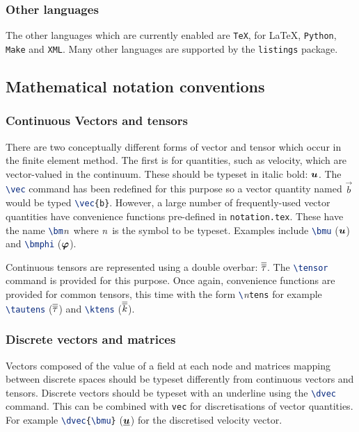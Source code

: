 \subsubsection{Other languages}

The other languages which are currently enabled are
\lstinline[language=TeX]+TeX+, for \LaTeX, \lstinline[language=TeX]+Python+,
\lstinline[language=TeX]+Make+ and \lstinline[language=TeX]+XML+. Many other
languages are supported by the \lstinline[language=TeX]+listings+ package.

\subsection{Mathematical notation conventions}

\subsubsection{Continuous Vectors and tensors}

There are two conceptually different forms of vector and tensor which occur
in the finite element method. The first is for quantities, such as velocity,
which are vector-valued in the continuum. These should be typeset in italic
bold: ${\mbox{\boldmath$u$}}$. The \lstinline[language=TeX]+\vec+ command has been redefined
for this purpose so a vector quantity named $\vec{b}$ would be typed
\lstinline[language=TeX]+\vec{b}+. However, a large number of
frequently-used vector quantities have convenience functions pre-defined in
\lstinline[language=bash]+notation.tex+. These have the name
\lstinline[language=TeX]+\bm+\textit{n}\ where \textit{n}\ is the symbol to
be typeset. Examples include \lstinline[language=TeX]+\bmu+ (${\mbox{\boldmath$u$}}$) and
\lstinline[language=TeX]+\bmphi+ (${\mbox{\boldmath$\varphi$}}$).

Continuous tensors are represented using a double overbar:
$\overline{\overline{\tau}}$. The \lstinline[language=TeX]+\tensor+ command is provided
for this purpose. Once again, convenience functions are provided for common
tensors, this time with the form
\lstinline[language=TeX]+\+\textit{n}\lstinline[language=TeX]+tens+ for
example \lstinline[language=TeX]+\tautens+ ($\overline{\overline{\tau}}$) and
\lstinline[language=TeX]+\ktens+ ($\overline{\overline{k}}$).

\subsubsection{Discrete vectors and matrices}

Vectors composed of the value of a field at each node and matrices mapping
between discrete spaces should be typeset differently from continuous
vectors and tensors. Discrete vectors should be typeset with an underline
using the \lstinline[language=TeX]+\dvec+ command. This can be combined with
\lstinline[language=TeX]+vec+ for discretisations of vector quantities. For
example \lstinline[language=TeX]+\dvec{\bmu}+ ($\underline{{\mbox{\boldmath$u$}}}$) for the
discretised velocity vector.


